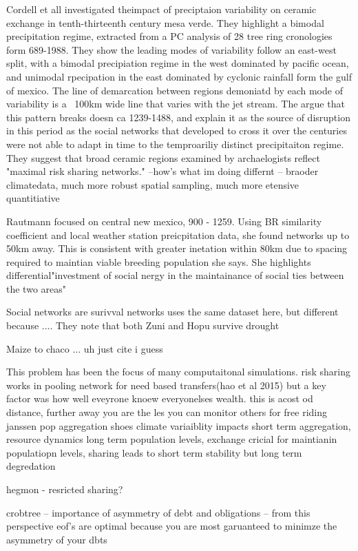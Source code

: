 \documentclass[fleqn,10pt]{wlscirep}
\begin{document}
Cordell et all investigated theimpact of preciptaion variability on ceramic exchange in tenth-thirteenth century mesa verde. They highlight a bimodal precipitation regime, extracted from a PC analysis of 28 tree ring cronologies form 689-1988. They show the leading modes of variability follow an east-west split, with a bimodal precipiation regime in the west dominated by pacific ocean, and unimodal rpecipation in the east dominated by cyclonic rainfall form the gulf of mexico. The line of demarcation between regions demoniatd by each mode of variability is a ~100km wide line that varies with the jet stream. The argue that this pattern breaks doesn ca 1239-1488, and explain it as the source of disruption in this period as the social networks that developed to cross it over the centuries were not able to adapt in time to the temproariliy distinct precipitaiton regime. They suggest that broad ceramic regions examined by archaelogists reflect "maximal risk sharing networks."
--how's what im doing differnt -- braoder climatedata, much more robust spatial sampling, much more etensive quantitiative

Rautmann focused on central new mexico, 900 - 1259. Using BR similarity coefficient and local weather station preicpitation data, she found networks up to 50km away. This is consistent with greater inetation within 80km due to spacing required to maintian viable breeding population she says. She highlights differential"investment of social nergy in the maintainance of social ties between the two areas"

Social networks are surivval networks uses the same dataset here, but different because ....
They note that both Zuni and Hopu survive drought

Maize to chaco ... uh just cite i guess


This problem has been the focus of many computaitonal simulations. risk sharing works in pooling network for need based transfers(hao et al 2015) but a key factor was how well eveyrone knoew everyonelses wealth. this is acost od distance, further away you are the les you can monitor others for free riding
janssen pop aggregation shoes climate variaiblity impacts short term aggregation, resource dynamics long term population levels, exchange cricial for maintianin populatiopn levels, sharing leads to short term stability but long term degredation

hegmon - resricted sharing?

crobtree -- importance of asymmetry of debt and obligations -- from this perspective eof's are optimal because you are most garuanteed to minimze the asymmetry of your dbts
\end{document}
